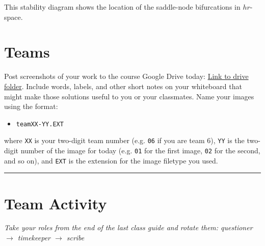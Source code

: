 \documentclass[12pt]{amsart}
\theoremstyle{conjecture}
\theoremstyle{definition}
\theoremstyle{question}
\theoremstyle{theorem}
\newcommand{\sectionrule}{%
    \vspace{0.3em}
    \hrule
    \vspace{0.8em}
}
\begin{document}
    This stability diagram shows the location of the saddle-node bifurcations in $hr$-space.

    \begin{center}
    \end{center}

    \section*{Teams}
    Post screenshots of your work to the course Google Drive today:
    \href{https://drive.google.com/drive/folders/1qUCUDY72_93QN_jbQVECuZSuCFrvwpSn?usp=drive_link}{Link to drive folder}.
    Include words, labels, and other short notes on your whiteboard that might make those solutions useful
    to you or your classmates. Name your images using the format:
    \begin{itemize}
        \item \texttt{teamXX-YY.EXT}
    \end{itemize}
    where \texttt{XX} is your two-digit team number (e.g. \texttt{06} if you are team 6), \texttt{YY} is
    the two-digit number of the image for today (e.g. \texttt{01} for the first image, \texttt{02} for the
    second, and so on), and \texttt{EXT} is the extension for the image filetype you used.

    \sectionrule
    \section*{Team Activity}
    \emph{Take your roles from the end of the last class guide and rotate them: questioner $\to$
        timekeeper $\to$ scribe}
\end{document}
